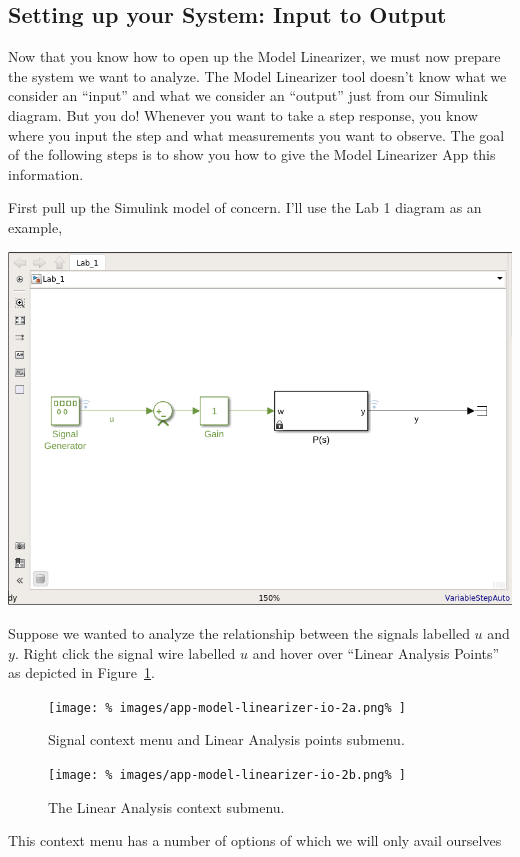 \subsection{Setting up your System: Input to Output}
\label{App:Simulink:ModelLinearizer:2}
Now that you know how to open up the Model Linearizer, we must now prepare
the system we want to analyze. The Model Linearizer tool doesn't know what
we consider an ``input'' and what we consider an ``output'' just from our
Simulink diagram. But you do! Whenever you want to take a step response, you
know where you input the step and what measurements you want to observe.
The goal of the following steps is to show you how to give the Model
Linearizer App this information.

First pull up the Simulink model of concern. I'll use the Lab 1 diagram as
an example,
%
\begin{center}
  \includegraphics[width=0.8\linewidth]{images/app-model-linearizer-io-1.png}
\end{center}
%
Suppose we wanted to analyze the relationship between the signals
labelled \(u\) and \(y.\)
Right click the signal wire labelled \(u\) and hover over ``Linear Analysis
Points'' as depicted in Figure~\ref{fig:app1:io-menu:a}.
%
\begin{figure}
  \centering
  \texttt{[image: \%
    images/app-model-linearizer-io-2a.png\%
  ]}
  \caption{Signal context menu and Linear Analysis points submenu.}
  \label{fig:app1:io-menu:a}
\end{figure}
%
\begin{figure}
  \centering
  \texttt{[image: \%
    images/app-model-linearizer-io-2b.png\%
  ]}
  \caption{The Linear Analysis context submenu.}
  \label{fig:app1:io-menu:b}
\end{figure}
%
This context menu has a number of options of which we will only avail ourselves
